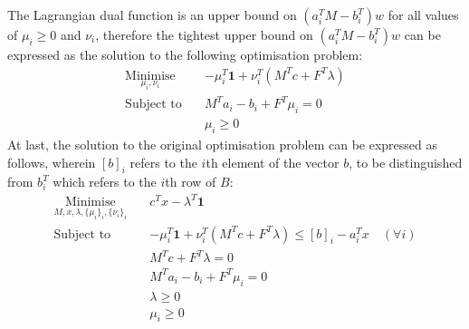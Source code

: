 The Lagrangian dual function is an upper bound on $(a_i^TM - b_i^T)w$ for all values of $\mu_i \ge 0$ and $\nu_i$, therefore the tightest upper bound on $(a_i^TM - b_i^T)w$ can be expressed as the solution to the following optimisation problem:
\begin{align*}
    \underset{\mu_i, \nu_i}{\text{Minimise}} \quad & -\mu_i^T \mathbf{1} + \nu_i^T(M^Tc + F^T\lambda) \\
    \text{Subject to} \quad & M^Ta_i - b_i + F^T\mu_i = 0 \\
    & \mu_i \ge 0
\end{align*}
At last, the solution to the original optimisation problem can be expressed as follows, wherein $[b]_i$ refers to the $i$th element of the vector $b$, to be distinguished from $b_i^T$ which refers to the $i$th row of $B$:
\begin{align*}
    \underset{M, x, \lambda, \{\mu_i\}_i, \{\nu_i\}_i}{\text{Minimise}} \quad & c^Tx - \lambda^T\mathbf{1} \\
    \text{Subject to} \quad & -\mu_i^T \mathbf{1} + \nu_i^T(M^Tc + F^T\lambda) \le [b]_i - a_i^Tx \quad (\forall i) \\
    & M^Tc + F^T\lambda = 0 \\
    & M^Ta_i - b_i + F^T\mu_i = 0 \\
    & \lambda \ge 0 \\
    & \mu_i \ge 0
\end{align*}
